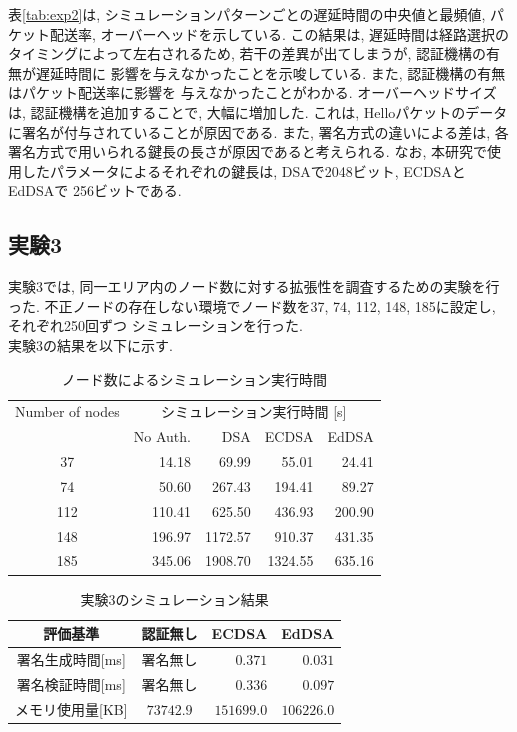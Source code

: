 \documentclass[a4j,9pt,twocolumn]{jsarticle}
\begin{document}
表\ref{tab:exp2}は, シミュレーションパターンごとの遅延時間の中央値と最頻値, 
パケット配送率, オーバーヘッドを示している. この結果は, 遅延時間は経路選択の
タイミングによって左右されるため, 若干の差異が出てしまうが, 認証機構の有無が遅延時間に
影響を与えなかったことを示唆している. また, 認証機構の有無はパケット配送率に影響を
与えなかったことがわかる. オーバーヘッドサイズは, 認証機構を追加することで,
大幅に増加した. これは, Helloパケットのデータに署名が付与されていることが原因である. 
また, 署名方式の違いによる差は, 各署名方式で用いられる鍵長の長さが原因であると考えられる. 
なお, 本研究で使用したパラメータによるそれぞれの鍵長は, DSAで2048ビット, ECDSAとEdDSAで
256ビットである. 

\subsection{実験3}
\indent 実験3では, 同一エリア内のノード数に対する拡張性を調査するための実験を行った. 
不正ノードの存在しない環境でノード数を37, 74, 112, 148, 185に設定し, それぞれ250回ずつ
シミュレーションを行った. \\
\indent 実験3の結果を以下に示す. 
\begin{table}[h]
    \centering
    \caption{ノード数によるシミュレーション実行時間}
    \label{tab:exp3_simtime}
    \begin{tabular}{c|rrrr} \hline
        Number of nodes & \multicolumn{4}{c}{シミュレーション実行時間 [s]} \\ \cline{2-5}
                       & No Auth. & DSA & ECDSA & EdDSA \\ \hline \hline
        37  &  14.18  &   69.99  &   55.01  &   24.41  \\
        74  &  50.60  &  267.43  &  194.41  &   89.27  \\
        112 & 110.41  &  625.50  &  436.93  &  200.90  \\
        148 & 196.97  & 1172.57  &  910.37  &  431.35  \\
        185 & 345.06  & 1908.70  & 1324.55  &  635.16  \\ \hline
    \end{tabular}
\end{table}
\vspace{-5mm}
\begin{table}[h]
    \centering
    \caption{実験3のシミュレーション結果}
    \label{tab:exp3_sig} 
    \begin{tabular}{c|crr} \hline
        評価基準 & 認証無し & ECDSA & EdDSA \\ \hline \hline
        署名生成時間[ms] & 署名無し & $0.371$ & $0.031$ \\
        署名検証時間[ms] & 署名無し & $0.336$ & $0.097$ \\
        メモリ使用量[KB] & $73742.9$ & $151699.0$ & $106226.0$ \\ \hline
    \end{tabular}
\end{table}
\end{document}
